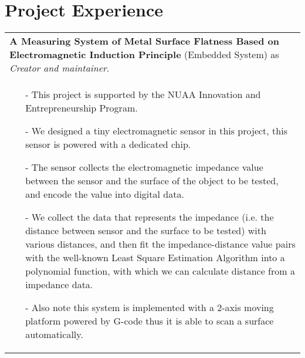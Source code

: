 \documentclass[a4paper,12pt]{article}
\newcommand{\signed}[1]{%
\unskip\nobreak\hfil\penalty50
   \hskip2em\hbox{}\nobreak\hfil#1
   \parfillskip=0pt \finalhyphendemerits=0 }
\begin{document}
\section{Project Experience}

\begin{tabularx}{\linewidth}{ @{}X@{}  }
\textbf{A Measuring System of Metal Surface Flatness Based on Electromagnetic Induction Principle} (Embedded System) as \textit{Creator and maintainer}.
\signed{Sept. 2018 - Nov. 2018}\\[3.75pt]
\begin{minipage}[t]{\linewidth}
    \begin{itemize}[nosep,after=\strut, leftmargin=1em, itemsep=3pt]
        \item[-] This project is supported by the NUAA Innovation and Entrepreneurship Program.
        \item[-] We designed a tiny electromagnetic sensor in this project, this sensor is powered with a dedicated chip.
        \item[-] The sensor collects the electromagnetic impedance value between the sensor and the surface of the object
        to be tested, and encode the value into digital data.
        \item[-] We collect the data that represents the impedance (i.e. the distance between sensor and the surface to be tested)
        with various distances, and then fit the impedance-distance value pairs with the well-known Least Square Estimation Algorithm
        into a polynomial function, with which we can calculate distance from a impedance data.
        \item[-] Also note this system is implemented with a 2-axis moving platform powered by G-code thus it is able to scan a surface automatically.
    \end{itemize}
\end{minipage}\\
\end{tabularx}
\end{document}
